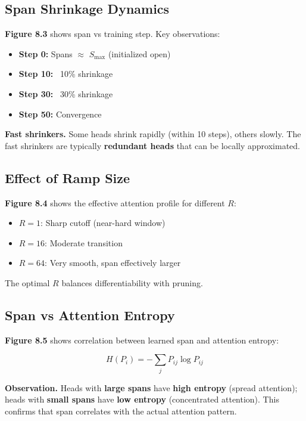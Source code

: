 \subsection{Span Shrinkage Dynamics}

\textbf{Figure 8.3} shows span vs training step. Key observations:

\begin{itemize}
\item \textbf{Step 0:} Spans $\approx$ $S_\text{max}$ (initialized open)
\item \textbf{Step 10:} ~10\% shrinkage
\item \textbf{Step 30:} ~30\% shrinkage
\item \textbf{Step 50:} Convergence

\end{itemize}
\textbf{Fast shrinkers.} Some heads shrink rapidly (within 10 steps), others 
slowly. The fast shrinkers are typically \textbf{redundant heads} that can be 
locally approximated.

\subsection{Effect of Ramp Size}

\textbf{Figure 8.4} shows the effective attention profile for different $R$:

\begin{itemize}
\item $R = 1$: Sharp cutoff (near-hard window)
\item $R = 16$: Moderate transition
\item $R = 64$: Very smooth, span effectively larger

\end{itemize}
The optimal $R$ balances differentiability with pruning.

\subsection{Span vs Attention Entropy}

\textbf{Figure 8.5} shows correlation between learned span and attention entropy:

\[
H(P_i) = -\sum_j P_{ij} \log P_{ij}
\]

\textbf{Observation.} Heads with \textbf{large spans} have \textbf{high entropy} (spread 
attention); heads with \textbf{small spans} have \textbf{low entropy} (concentrated 
attention). This confirms that span correlates with the actual attention 
pattern.

